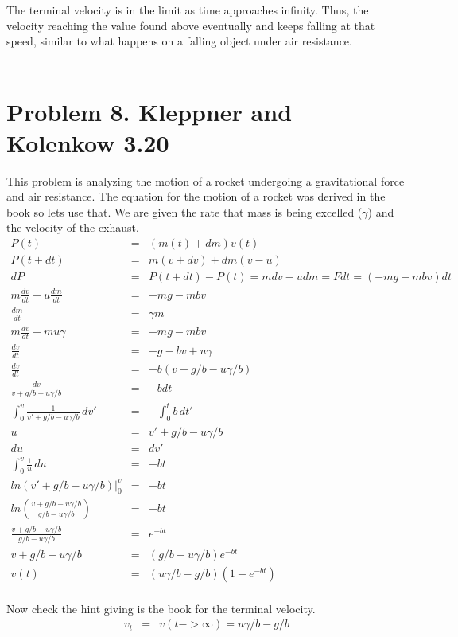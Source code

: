 \documentclass[11pt]{article}
\begin{document}
The terminal velocity is in the limit as time approaches infinity. Thus, the velocity reaching the value found above eventually and keeps falling at that speed, similar to what happens on a falling object under air resistance. \\ \\

\section*{Problem 8. Kleppner and Kolenkow 3.20}

This problem is analyzing the motion of a rocket undergoing a gravitational force and air resistance. The equation for the motion of a rocket was derived in the book so lets use that. We are given the rate that mass is being excelled ($\gamma$) and the velocity of the exhaust. \\
\begin{eqnarray*}
P(t) &=& (m(t)+dm)v(t) \\
P(t+dt) &=& m(v+dv)+dm(v-u)\\
dP &=& P(t+dt)-P(t) = mdv-udm = Fdt = (-mg-mbv)dt \\
m\frac{dv}{dt}-u\frac{dm}{dt} &=& -mg-mbv \\
\frac{dm}{dt} &=& \gamma{m} \\
m\frac{dv}{dt} -mu\gamma &=& -mg -mbv \\
\frac{dv}{dt} &=& -g -bv+u\gamma \\
\frac{dv}{dt} &=& -b(v+g/b-u\gamma/b) \\
\frac{dv}{v+g/b-u\gamma/b} &=& -bdt \\
\int_{0}^{v}\frac{1}{v'+g/b-u\gamma/b}\,dv' &=& -\int_{0}^{t}b\,dt' \\
u &=& v'+g/b-u\gamma/b \\
du &=& dv' \\
\int_{0}^{v}\frac{1}{u}\,du &=& -bt \\
 ln(v'+g/b-u\gamma/b)|_{0}^{v} &=& -bt \\
ln(\frac{v+g/b-u\gamma/b}{g/b-u\gamma/b}) &=& -bt \\
\frac{v+g/b-u\gamma/b}{g/b-u\gamma/b} &=& e^{-bt} \\ 
v+g/b-u\gamma/b &=& (g/b-u\gamma/b)e^{-bt} \\
v(t) &=& (u\gamma/b-g/b)(1-e^{-bt}) 
\end{eqnarray*} \\
Now check the hint giving is the book for the terminal velocity. \\
\begin{eqnarray*} 
v_{t} &=& v(t->\infty) = u\gamma/b-g/b
\end{eqnarray*} \\
\end{document}
